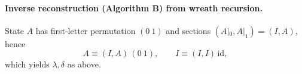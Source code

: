 \documentclass[11pt]{article}
\theoremstyle{definition}
\theoremstyle{plain}
\theoremstyle{remark}
\begin{document}
\paragraph{Inverse reconstruction (Algorithm B) from wreath recursion.}
State $A$ has first-letter permutation $(0\ 1)$ and sections $(A|_0,A|_1)=(I,A)$, hence
\[
A \equiv (I,A)\,(0\ 1),
\qquad
I \equiv (I,I)\,\mathrm{id},
\]
which yields $\lambda,\delta$ as above.




\end{document}
